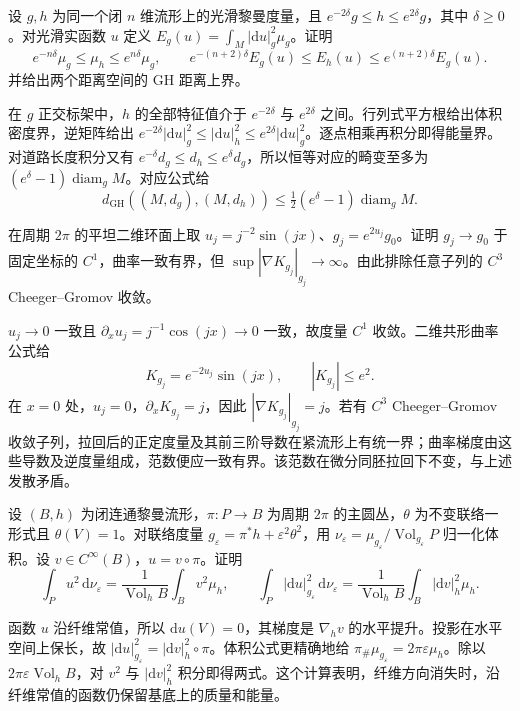 \begin{exercise}\label{g3:ex:metric-comparison-energy}
	设 \(g,h\) 为同一个闭 \(n\) 维流形上的光滑黎曼度量，且 \(e^{-2\delta}g\le h\le e^{2\delta}g\)，其中 \(\delta\ge0\)。对光滑实函数 \(u\) 定义 \(E_g(u)=\int_M|\mathrm du|_g^2\mu_g\)。证明
	\[
		e^{-n\delta}\mu_g\le\mu_h\le e^{n\delta}\mu_g,
		\qquad e^{-(n+2)\delta}E_g(u)\le E_h(u)\le e^{(n+2)\delta}E_g(u).
	\]
	并给出两个距离空间的 GH 距离上界。
\end{exercise}
\begin{solution}
	在 \(g\) 正交标架中，\(h\) 的全部特征值介于 \(e^{-2\delta}\) 与 \(e^{2\delta}\) 之间。行列式平方根给出体积密度界，逆矩阵给出 \(e^{-2\delta}|\mathrm du|_g^2\le|\mathrm du|_h^2\le e^{2\delta}|\mathrm du|_g^2\)。逐点相乘再积分即得能量界。对道路长度积分又有 \(e^{-\delta}d_g\le d_h\le e^\delta d_g\)，所以恒等对应的畸变至多为 \((e^\delta-1)\operatorname{diam}_gM\)。对应公式给
	\[
		d_{\mathrm{GH}}((M,d_g),(M,d_h))
		\le\tfrac12(e^\delta-1)\operatorname{diam}_gM.
	\]
\end{solution}

\begin{exercise}\label{g3:ex:curvature-derivative-control}
	在周期 \(2\pi\) 的平坦二维环面上取 \(u_j=j^{-2}\sin(jx)\)、\(g_j=e^{2u_j}g_0\)。证明 \(g_j\to g_0\) 于固定坐标的 \(C^1\)，曲率一致有界，但 \(\sup|\nabla K_{g_j}|_{g_j}\to\infty\)。由此排除任意子列的 \(C^3\) Cheeger--Gromov 收敛。
\end{exercise}
\begin{solution}
	\(u_j\to0\) 一致且 \(\partial_xu_j=j^{-1}\cos(jx)\to0\) 一致，故度量 \(C^1\) 收敛。二维共形曲率公式给
	\[
		K_{g_j}=e^{-2u_j}\sin(jx),\qquad |K_{g_j}|\le e^2.
	\]
	在 \(x=0\) 处，\(u_j=0\)，\(\partial_xK_{g_j}=j\)，因此 \(|\nabla K_{g_j}|_{g_j}=j\)。若有 \(C^3\) Cheeger--Gromov 收敛子列，拉回后的正定度量及其前三阶导数在紧流形上有统一界；曲率梯度由这些导数及逆度量组成，范数便应一致有界。该范数在微分同胚拉回下不变，与上述发散矛盾。
\end{solution}

\begin{exercise}\label{g3:ex:circle-bundle-basic-energy}
	设 \((B,h)\) 为闭连通黎曼流形，\(\pi:P\to B\) 为周期 \(2\pi\) 的主圆丛，\(\theta\) 为不变联络一形式且 \(\theta(V)=1\)。对联络度量 \(g_\varepsilon=\pi^*h+\varepsilon^2\theta^2\)，用 \(\nu_\varepsilon=\mu_{g_\varepsilon}/\operatorname{Vol}_{g_\varepsilon}P\) 归一化体积。设 \(v\in C^\infty(B)\)，\(u=v\circ\pi\)。证明
	\[
		\int_Pu^2\,\mathrm d\nu_\varepsilon
		=\frac{1}{\operatorname{Vol}_hB}\int_Bv^2\mu_h,
		\qquad
		\int_P|\mathrm du|_{g_\varepsilon}^2\,\mathrm d\nu_\varepsilon
		=\frac{1}{\operatorname{Vol}_hB}\int_B|\mathrm dv|_h^2\mu_h.
	\]
\end{exercise}
\begin{solution}
	函数 \(u\) 沿纤维常值，所以 \(\mathrm du(V)=0\)，其梯度是 \(\nabla_hv\) 的水平提升。投影在水平空间上保长，故 \(|\mathrm du|_{g_\varepsilon}^2=|\mathrm dv|_h^2\circ\pi\)。体积公式更精确地给 \(\pi_\#\mu_{g_\varepsilon}=2\pi\varepsilon\mu_h\)。除以 \(2\pi\varepsilon\operatorname{Vol}_hB\)，对 \(v^2\) 与 \(|\mathrm dv|_h^2\) 积分即得两式。这个计算表明，纤维方向消失时，沿纤维常值的函数仍保留基底上的质量和能量。
\end{solution}

